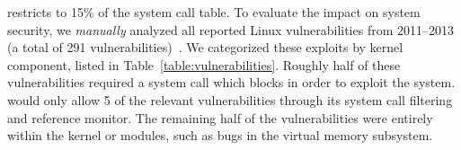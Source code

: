 \begin{comment}
Consider the configuration illustrated in Figure \ref{fig:coordination} and assume that \picoproc{} 1 is malicious . In our first experiment, \picoproc{} 1 unsuccessfully attempts to fork a non-\sysname{} process by invoking the {\tt fork()} function and also invoking the {\tt fork} system call directly. Since \sysname{} hooks system calls at the kernel level, it does not matter how the fork occurs since the kernel checks whether it is a \sysname{} \picoproc{} that is calling {\tt fork} and creates a new \sysname{} process if it is. 

In our second experiment \picoproc{} 1 attempts to kill \picoproc{} 3 in a separate sandbox. Picoprocess 1 is blocked from calling the kill command on any process that is not explicitly contained in its sandbox since the PID is checked against the sandbox's PID list. 


In a third experiment \picoproc{} 1 tries to access files that do not belong in its Manifest. Picoprocess 1 attempts to circumvent the Manifest rules through the function {\tt open}, {\tt fopen}, and also by calling the open system call directly. When the open system call is called, it’s filename parameter is checked against a list of acceptable directories and rejected if it does not match anything in this list. This blocks the \picoproc{} 1 from accessing illegal files.

In our last experiment, \picoproc{} 1 attempts to obtain secrets from \picoproc{} 3, in an attack similar to Memento \citep{memento}. \sysname{} processes are restricted from using the proc file system in order gain information about system processes.  In our experiment, \picoproc{} 1's manifest file was setup to deny access to this directory and, as a result, it was unable access system or other processes' information outside its sandbox.
\end{comment}

\vspace{5pt}
 \sysname{} restricts \picoprocs{} to 15\% of the system call table.
To evaluate the impact on system security,
we \emph{manually} analyzed
all reported Linux vulnerabilities from 2011--2013 (a total
of 291 vulnerabilities)~\citep{linuxvuln}.
We categorized these exploits by kernel component, listed in Table~\ref{table:vulnerabilities}.
Roughly half of these vulnerabilities required a system
call  which \sysname{} blocks in order to exploit the system.
\sysname{} would only allow 5 of the relevant vulnerabilities
through its system call filtering and reference monitor.
The remaining half of the vulnerabilities were entirely within the kernel or modules,
    such as bugs in the virtual memory subsystem.

